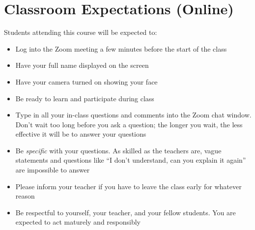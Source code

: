 \documentclass{../../oss-handout}
\begin{document}
\section{Classroom Expectations (Online)}

Students attending this course will be expected to:
\begin{itemize}[nosep]
\item Log into the Zoom meeting a few minutes before the start of the class
\item Have your full name displayed on the screen
\item Have your camera turned on showing your face
\item Be ready to learn and participate during class
\item Type in all your in-class questions and comments into the Zoom chat
  window. Don't wait too long before you ask a question; the longer you wait,
  the less effective it will be to answer your questions
\item Be \emph{specific} with your questions. As skilled as the teachers are,
  vague statements and questions like ``I don't understand, can you explain it
  again'' are impossible to answer
\item Please inform your teacher if you have to leave the class early for
  whatever reason
\item Be respectful to yourself, your teacher, and your fellow students. You
  are expected to act maturely and responsibly
\end{itemize}
\end{document}
